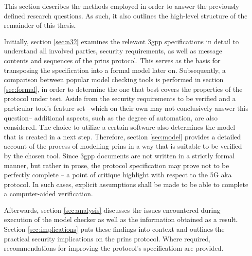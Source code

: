 This section describes the methods employed in order to answer the previously defined research questions.
As such, it also outlines the high-level structure of the remainder of this thesis.

Initially, section \ref{sec:n32} examines the relevant \gls{3gpp} specifications in detail to understand all involved parties, security requirements, as well as message contents and sequences of the \gls{prins} protocol.
This serves as the basis for transposing the specification into a formal model later on.
Subsequently, a comparison between popular model checking tools is performed in section \ref{sec:formal}, in order to determine the one that best covers the properties of the protocol under test.
Aside from the security requirements to be verified and a particular tool's feature set --which on their own may not conclusively answer this question-- additional aspects, such as the degree of automation, are also considered.
The choice to utilize a certain software also determines the model that is created in a next step.
Therefore, section \ref{sec:model} provides a detailed account of the process of modelling \gls{prins} in a way that is suitable to be verified by the chosen tool.
Since \gls{3gpp} documents are not written in a strictly formal manner, but rather in prose, the protocol specification may prove not to be perfectly complete -- a point of critique \cite{basin2018model} highlight with respect to the 5G \gls{aka} protocol.
In such cases, explicit assumptions shall be made to be able to complete a computer-aided verification.

Afterwards, section \ref{sec:analysis} discusses the issues encountered during execution of the model checker as well as the information obtained as a result.
Section \ref{sec:implications} puts these findings into context and outlines the practical security implications on the \gls{prins} protocol.
Where required, recommendations for improving the protocol's specificatiom are provided.
